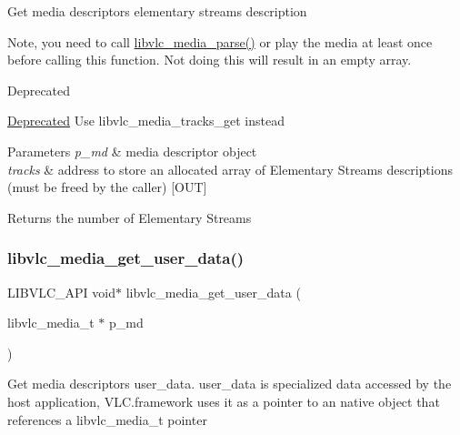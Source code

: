 Get media descriptor\textquotesingle{}s elementary streams description

Note, you need to call \hyperlink{group__libvlc__media_gad9e48150dcb1a066c51688f6e4a216f1}{libvlc\+\_\+media\+\_\+parse()} or play the media at least once before calling this function. Not doing this will result in an empty array.

\begin{DoxyRefDesc}{Deprecated}
\item[\hyperlink{deprecated__deprecated000054}{Deprecated}]Use libvlc\+\_\+media\+\_\+tracks\+\_\+get instead\end{DoxyRefDesc}



\begin{DoxyParams}{Parameters}
{\em p\+\_\+md} & media descriptor object \\
\hline
{\em tracks} & address to store an allocated array of Elementary Streams descriptions (must be freed by the caller) \mbox{[}O\+UT\mbox{]}\\
\hline
\end{DoxyParams}
\begin{DoxyReturn}{Returns}
the number of Elementary Streams 
\end{DoxyReturn}
\mbox{\label{group__libvlc__media_ga1aa2355e48bbb47a7f8d7f1bb4a8101f}} 
\subsubsection{\texorpdfstring{libvlc\+\_\+media\+\_\+get\+\_\+user\+\_\+data()}{libvlc\_media\_get\_user\_data()}}
{\footnotesize\ttfamily L\+I\+B\+V\+L\+C\+\_\+\+A\+PI void$\ast$ libvlc\+\_\+media\+\_\+get\+\_\+user\+\_\+data (\begin{DoxyParamCaption}\item[{libvlc\+\_\+media\+\_\+t $\ast$}]{p\+\_\+md }\end{DoxyParamCaption})}

Get media descriptor\textquotesingle{}s user\+\_\+data. user\+\_\+data is specialized data accessed by the host application, V\+L\+C.\+framework uses it as a pointer to an native object that references a libvlc\+\_\+media\+\_\+t pointer


